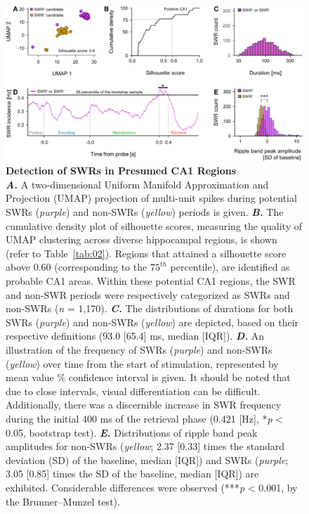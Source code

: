 \documentclass[final,3p,times,twocolumn]{elsarticle}
\begin{document}
        \clearpage
        \begin{figure}[ht]
        	\centering
            \includegraphics[width=1\textwidth]{./src/figures/.png/Figure_ID_04.png}
        	\caption{\textbf{Detection of SWRs in Presumed CA1 Regions}
\smallskip
\\
\textbf{\textit{A.}} A two-dimensional Uniform Manifold Approximation and Projection (UMAP) projection of multi-unit spikes during potential SWRs (\textit{purple}) and non-SWRs (\textit{yellow}) periods is given\cite{mcinnes_umap_2018}. \textbf{\textit{B.}} The cumulative density plot of silhouette scores, measuring the quality of UMAP clustering across diverse hippocampal regions, is shown (refer to Table~\ref{tab:02}). Regions that attained a silhouette score above 0.60 (corresponding to the $75^{th}$ percentile), are identified as probable CA1 areas. Within these potential CA1 regions, the SWR and non-SWR periods were respectively categorized as SWRs and non-SWRs (\textit{n} = 1,170)\cite{rousseeuw_silhouettes_1987}. \textbf{\textit{C.}} The distributions of durations for both SWRs (\textit{purple}) and non-SWRs (\textit{yellow}) are depicted, based on their respective definitions (93.0 [65.4] ms, median [IQR])\cite{girardeau_selective_2009}\cite{norman_hippocampal_2021}. \textbf{\textit{D.}} An illustration of the frequency of SWRs (\textit{purple}) and non-SWRs (\textit{yellow}) over time from the start of stimulation, represented by mean value \% confidence interval is given. It should be noted that due to close intervals, visual differentiation can be difficult. Additionally, there was a discernible increase in SWR frequency during the initial 400 ms of the retrieval phase (0.421 [Hz], *\textit{p} < 0.05, bootstrap test)\cite{buzsaki_hippocampal_2015}\cite{ego-stengel_disruption_2010}\cite{fernandez-ruiz_long-duration_2019}. \textbf{\textit{E.}} Distributions of ripple band peak amplitudes for non-SWRs (\textit{yellow}; 2.37 [0.33] times the standard deviation (SD) of the baseline, median [IQR]) and SWRs (\textit{purple}; 3.05 [0.85] times the SD of the baseline, median [IQR]) are exhibited. Considerable differences were observed (***\textit{p} < 0.001, by the Brunner--Munzel test)\cite{norman_hippocampal_2019}\cite{diba_forward_2007}\cite{liu_consensus_2022}.
}
        	\label{fig:04}
        \end{figure}
\end{document}
